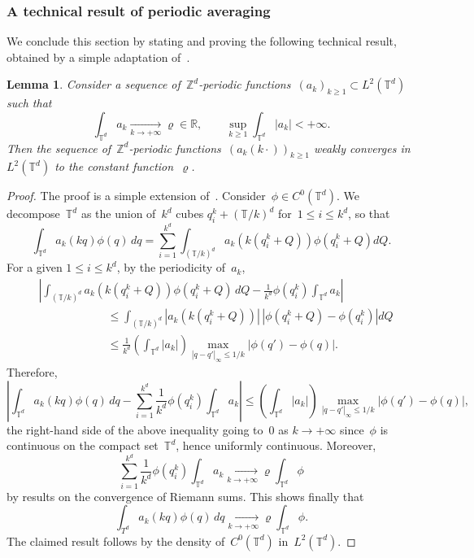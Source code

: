 \documentclass{article}
\newtheorem{lemma}{Lemma}
\renewcommand{\leq}{\leqslant}
\renewcommand{\geq}{\geqslant}
\def\T{\mathbb{T}}
\def\Z{\mathbb{Z}}
\renewcommand{\dim}{d}
\begin{document}
\subsubsection{A technical result of periodic averaging}
\label{sec:lemma_avg}

We conclude this section by stating and proving the following technical result, obtained by a simple adaptation of~\cite[Lemma~1.3.19]{allaire_homogeneisation}.

\begin{lemma}
  \label{lem:homog_lim}
  Consider a sequence of~$\Z^\dim$-periodic functions~$(a_k)_{k \geq 1} \subset L^2(\T^\dim)$ such that
  \[
  \int_{\T^\dim} a_k \xrightarrow[k \to +\infty]{} \varrho \in \mathbb{R}, 
  \qquad 
  \sup_{k \geq 1} \int_{\T^\dim} |a_k| < +\infty.
  \]
  Then the sequence of~$\Z^\dim$-periodic functions~$(a_k(k\cdot))_{k \geq 1}$ weakly converges in~$L^2(\T^\dim)$ to the constant function~$\varrho$.
\end{lemma}

\begin{proof}
The proof is a simple extension of~\cite[Lemma~1.3.19]{allaire_homogeneisation}. Consider~$\phi\in C^0(\T^\dim)$. We decompose~$\T^\dim$ as the union of~$k^\dim$ cubes $q_i^k + (\T/k)^\dim$ for~$1 \leq i \leq k^\dim$, so that
\[
\int_{\T^\dim} a_k(kq) \phi(q) \, dq = \sum_{i=1}^{k^\dim} \int_{(\T/k)^\dim} a_k\left(k(q_i^k+Q)\right) \phi\left(q_i^k+Q\right) dQ.
\]
For a given $1 \leq i \leq k^\dim$, by the periodicity of~$a_k$,
\[
\begin{aligned}
& \left|\int_{(\T/k)^\dim} a_k(k(q_i^k+Q)) \phi(q_i^k+Q) \, dQ - \frac{1}{k^\dim} \phi(q_i^k) \int_{\T^\dim} a_k \right| \\
& \qquad\qquad\qquad\leq \int_{(\T/k)^\dim} \left|a_k(k(q_i^k+Q))\right| \, \left|\phi(q_i^k+Q)-\phi(q_i^k)\right| dQ \\
& \qquad\qquad\qquad \leq \frac{1}{k^\dim} \left(\int_{\T^\dim} |a_k|\right)\max_{|q-q'|_\infty \leq 1/k}|\phi(q')-\phi(q)|.
\end{aligned}
\]
Therefore, 
\[
\left| \int_{\T^\dim} a_k(kq) \phi(q) \, dq - \sum_{i=1}^{k^\dim} \frac{1}{k^\dim} \phi(q_i^k) \int_{\T^\dim} a_k \right| \leq \left(\int_{\T^\dim} |a_k|\right)\max_{|q-q'|_\infty \leq 1/k}|\phi(q')-\phi(q)|,
\]
the right-hand side of the above inequality going to~0 as $k \to +\infty$ since~$\phi$ is continuous on the compact set~$\T^\dim$, hence uniformly continuous. Moreover, 
\[
\sum_{i=1}^{k^\dim} \frac{1}{k^\dim} \phi(q_i^k) \int_{\T^\dim} a_k \xrightarrow[k \to +\infty]{} \varrho \int_{\T^\dim} \phi
\]
by results on the convergence of Riemann sums. This shows finally that
\[
\int_{T^\dim} a_k(kq) \phi(q) \, dq \xrightarrow[k \to +\infty]{} \varrho \int_{\T^\dim} \phi.
\]
The claimed result follows by the density of~$C^0(\T^\dim)$ in~$L^2(\T^\dim)$.
\end{proof}
\end{document}
